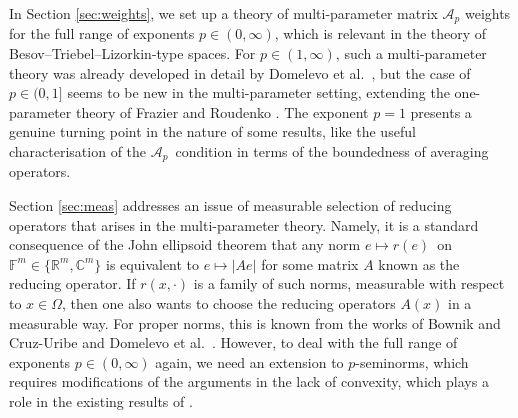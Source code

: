 \documentclass[11pt, reqno]{amsart}
\theoremstyle{definition}
\theoremstyle{remark}
\numberwithin{equation}{section}
\newcommand{\A}{\mathscr A}
\newcommand{\C}{\mathbb C}
\newcommand{\F}{\mathbb F}
\newcommand{\R}{\mathbb R}
\newcommand{\abs}[1]{|#1|}
\begin{document}
In Section \ref{sec:weights}, we set up a theory of multi-parameter matrix $\A_p$ weights for the full range of exponents $p\in(0,\infty)$, which is relevant in the theory of Besov--Triebel--Lizorkin-type spaces. For $p\in(1,\infty)$, such a multi-parameter theory was already developed in detail by Domelevo et al.\ \cite{DKPS}, but the case of $p\in(0,1]$ seems to be new in the multi-parameter setting, extending the one-parameter theory of Frazier and Roudenko \cite{FR04}. The exponent $p=1$ presents a genuine turning point in the nature of some results, like the useful characterisation of the $\A_p$ condition in terms of the boundedness of averaging operators.

Section \ref{sec:meas} addresses an issue of measurable selection of reducing operators that arises in the multi-parameter theory. Namely, it is a standard consequence of the John ellipsoid theorem that any norm $e\mapsto r(e)$ on $\F^m\in\{\R^m,\C^m\}$ is equivalent to $e\mapsto\abs{Ae}$ for some matrix $A$ known as the reducing operator. If $r(x,\cdot)$ is a family of such norms, measurable with respect to $x\in\Omega$, then one also wants to choose the reducing operators $A(x)$ in a measurable way. For proper norms, this is known from the works of Bownik and Cruz-Uribe \cite{BCU} and Domelevo et al.\ \cite{DKPS}. However, to deal with the full range of exponents $p\in(0,\infty)$ again, we need an extension to $p$-seminorms, which requires modifications of the arguments in the lack of convexity, which plays a role in the existing results of \cite{BCU,DKPS}.
\end{document}
